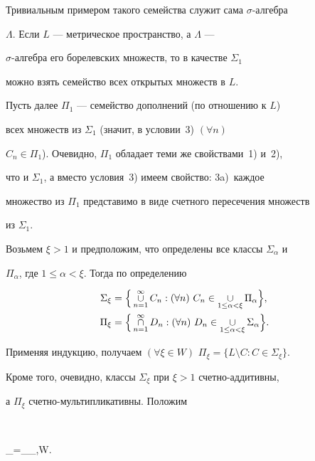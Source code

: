  


Тривиальным примером такого семейства служит сама $\sigma$-алгебра 


$\Lambda$. Если $L$ --- метрическое пространство, а $\Lambda$ --- 


$\sigma$-алгебра его борелевских множеств, то в качестве $\Sigma_1$ 


можно взять семейство всех открытых множеств в $L$. 


 


Пусть далее $\Pi_1$ --- семейство дополнений (по отношению к $L$) 


всех множеств из $\Sigma_1$ (значит, в условии~3) $(\forall n)$ 


$C_n\in\Pi_1$). Очевидно, $\Pi_1$ обладает теми же свойствами~1) и~2), 


что и $\Sigma_1$, а вместо условия~3) имеем свойство: 3a)~каждое 


множество из $\Pi_1$ представимо в виде счетного пересечения множеств 


из $\Sigma_1$. 


 


Возьмем $\xi>1$ и предположим, что определены все классы $\Sigma_\alpha$ и 


$\Pi_\alpha$, где $1\le\alpha<\xi$. Тогда по определению 


\begin{align} 


\Sigma_\xi&=\Big\{\mycup^\infty_{n=1}C_n:(\forall n) 


\ C_n\in\mycup_{1\le\alpha<\xi}\Pi_\alpha\Big\},\\ 


% 


\Pi_\xi&=\Big\{\mycap^\infty_{n=1}D_n:(\forall n) 


\ D_n\in \mycup_{1\le\alpha<\xi}\Sigma_\alpha\Big\}. 


\end{align} 


Применяя индукцию, получаем $(\forall \xi\in W)$ $\Pi_\xi=\{L\setminus 


C:C\in\Sigma_\xi\}$. 


Кроме того, очевидно, классы $\Sigma_\xi$ при $\xi>1$ счетно-аддитивны, 


а $\Pi_\xi$ счетно-мультипликативны. Положим 


$$ 


\Delta_\xi=\Sigma_\xi\cap\Pi_\xi,\quad \xi\in W. 


